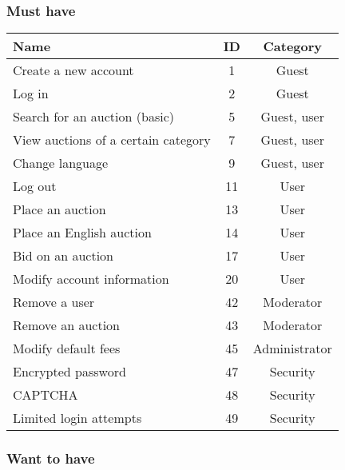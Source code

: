 	\subsubsection{Must have}
	
	\begin{tabular}{l|c c}
	  Name & ID & Category \\ 
	  \hline
	  Create a new account & 1 & Guest \\ 
	  Log in & 2 & Guest \\	  
	  Search for an auction (basic) & 5 & Guest, user \\
	  View auctions of a certain category & 7 & Guest, user \\
	  Change language & 9 & Guest, user \\
	  Log out & 11 & User \\
	  Place an auction & 13 & User \\
	  Place an English auction & 14 & User \\
	  Bid on an auction & 17 & User \\
	  Modify account information & 20 & User \\
	  Remove a user & 42 & Moderator \\
	  Remove an auction & 43 & Moderator \\
	  Modify default fees & 45 & Administrator \\
	  Encrypted password & 47 & Security \\
	  CAPTCHA & 48 & Security \\
	  Limited login attempts & 49 & Security \\  	  
	\end{tabular} 
	
	\subsubsection{Want to have}
	
